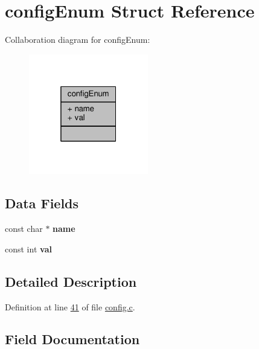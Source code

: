 \hypertarget{structconfigEnum}{}\section{config\+Enum Struct Reference}
\label{structconfigEnum}


Collaboration diagram for config\+Enum\+:\nopagebreak
\begin{figure}[H]
\begin{center}
\leavevmode
\includegraphics[width=148pt]{structconfigEnum__coll__graph}
\end{center}
\end{figure}
\subsection*{Data Fields}
\begin{DoxyCompactItemize}
\item 
\mbox{\label{structconfigEnum_a6160a6cda270a7da6d69238e1543220c}} 
const char $\ast$ {\bfseries name}
\item 
\mbox{\label{structconfigEnum_ac241b68cfa212a23daac1b48de339aa6}} 
const int {\bfseries val}
\end{DoxyCompactItemize}


\subsection{Detailed Description}


Definition at line \hyperlink{config_8c_source_l00041}{41} of file \hyperlink{config_8c_source}{config.\+c}.



\subsection{Field Documentation}
\mbox{\label{structconfigEnum_a6160a6cda270a7da6d69238e1543220c}} 
